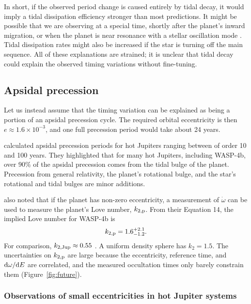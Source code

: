 \documentclass[12pt,twocolumn,tighten]{aastex62}
\begin{document}
In short, if the observed period change is caused entirely by tidal
decay, it would imply a tidal dissipation efficiency stronger than
most predictions.  It might be possible that we are observing at a
special time, shortly after the planet's inward migration, or when the
planet is near resonance with a stellar oscillation mode
\citep{ogilvie_tidal_2014,essick_orbital_2016}.  Tidal dissipation
rates might also be increased if the star is turning off the main
sequence.  All of these explanations are strained; it is unclear that
tidal decay could explain the observed timing variations without
fine-tuning.


\subsection{Apsidal precession}
\label{sec:apsidal_precession}

Let us instead assume that the timing variation can be explained as
being a portion of an apsidal precession cycle.  The required orbital
eccentricity is then $e\approx 1.6\times10^{-3}$, and one full
precession period would take about 24 years.

\citet{ragozzine_probing_2009} calculated apsidal precession periods
for hot Jupiters ranging between of order 10 and 100 years.  They
highlighted that for many hot Jupiters, including WASP-4b, over 90\%
of the apsidal precession comes from the tidal bulge of the planet.
Precession from general relativity, the planet's rotational bulge, and
the star's rotational and tidal bulges are minor additions.

\citet{ragozzine_probing_2009} also noted that if the planet has
non-zero eccentricity, a measurement of $\dot{\omega}$ can be used to
measure the planet's Love number, $k_{2,\rm p}$.  From their Equation
14, the implied Love number for WASP-4b is
\begin{equation}
k_{2,{\rm p}} = 1.6^{+2.1}_{-1.2}.
\end{equation}
For comparison, $k_{2,{\rm Jup}} \approx 0.55$
\citep{wahl_tidal_2016,ni_empirical_2018}.  A uniform density sphere
has $k_2 = 1.5$.  The uncertainties on $k_{2,{\rm p}}$ are large
because the eccentricity, reference time, and ${\rm d}\omega/{\rm d}E$
are correlated, and the measured occultation times only barely
constrain them (Figure~\ref{fig:future}).

\subsubsection{Observations of small eccentricities in hot
Jupiter systems}
\end{document}
